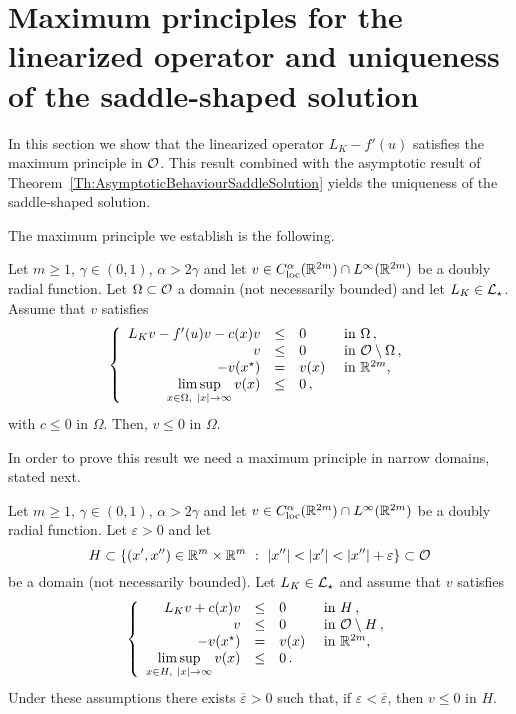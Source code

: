 \section{Maximum principles for the linearized operator and uniqueness of the saddle-shaped solution}
\label{Sec:MaximumPrinciple}

In this section we show that the linearized operator $L_K  -f'(u)$ satisfies the maximum principle in $\mathcal{O}$. This result combined with the asymptotic result of Theorem~\ref{Th:AsymptoticBehaviourSaddleSolution} yields the uniqueness of the saddle-shaped solution.

The maximum principle we establish is the following.

\begin{proposition}
	\label{Prop:MaximumPrincipleInO}
	Let $m\geq 1$, $\gamma \in (0,1)$, $\alpha > 2\gamma$ and let $v\in C^\alpha_{\mathrm{loc}}(\mathbb{R}^{2m})\cap L^\infty(\mathbb{R}^{2m})$ be a doubly radial function. Let $\Omega \subset \mathcal{O}$ a domain (not necessarily bounded) and let $L_K  \in \mathcal{L}_\star$. Assume that $v$ satisfies
	$$
	\left\{\begin{array}{rcll}
	L_K v - f'(u)v - c(x)v &\leq & 0 &\textrm{ in } \Omega\,,\\
	v &\leq & 0 &\textrm{ in } \mathcal{O} \setminus \Omega\,,\\
	- v(x^\star) & = & v(x) &\textrm{ in } \mathbb{R}^{2m},\\
	\displaystyle \limsup_{x\in \Omega, \ |x|\to \infty} v(x) &\leq & 0\,,
	\end{array} \right.
	$$
	with $c\leq 0$ in $\Omega$.
	Then, $v \leq 0$ in $\Omega$.
\end{proposition}

In order to prove this result we need a maximum principle in narrow domains, stated next.

\begin{proposition}
	\label{Prop:MaximumPrincipleNarrowDomainsOdd}
	Let $m\geq 1$, $\gamma \in (0,1)$, $\alpha > 2\gamma$ and let $v\in C^\alpha_{\mathrm{loc}}(\mathbb{R}^{2m})\cap L^\infty(\mathbb{R}^{2m})$ be a doubly radial function. Let $\varepsilon>0$ and let
	$$
	H \subset \{(x',x'')\in \R^m\times\R^m \ : \ |x''|<|x'|<|x''|+ \varepsilon\} \subset \ocal
	$$ 
	be a domain (not necessarily bounded). Let $L_K  \in \mathcal{L}_\star$ and assume that $v$ satisfies
	\begin{equation}
	\label{Eq:AssumptionsMaxPNarrow}
	\left\{\begin{array}{rcll}
	L_K v + c(x)v&\leq & 0 &\textrm{ in } H\,,\\
	v &\leq & 0 &\textrm{ in } \mathcal{O} \setminus H\,,\\
	- v(x^\star) & = & v(x) &\textrm{ in } \mathbb{R}^{2m},\\
	\displaystyle \limsup_{x\in H, \ |x|\to \infty} v(x) &\leq & 0\,.
	\end{array} \right.
	\end{equation}
	Under these assumptions there exists $\overline{\varepsilon}>0$ such that, if $\varepsilon<\overline{\varepsilon}$, then $v \leq 0$ in $H$.
\end{proposition}

